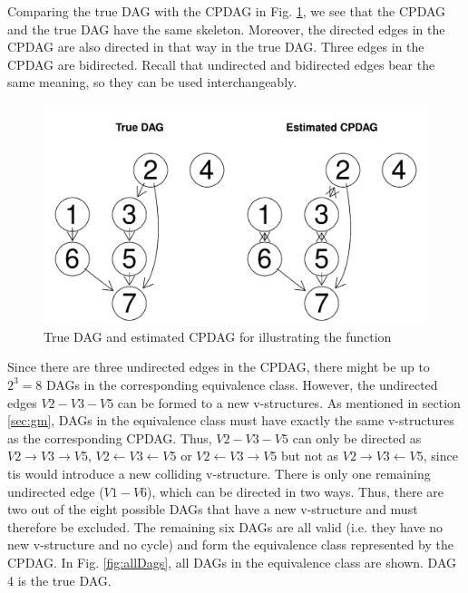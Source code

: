\documentclass[article]{jss}
\begin{document}
Comparing the true DAG with the CPDAG in Fig. \ref{fig:ida}, we see that
the CPDAG and the true DAG have the same skeleton. Moreover, the directed
edges in the CPDAG are also directed in that way in the true DAG. Three
edges in the CPDAG are bidirected. Recall that undirected and bidirected
edges bear the same meaning, so they can be used interchangeably.
\begin{figure}
  \begin{center}
\includegraphics{pcalgDoc-idaExpl2}
\caption{True DAG and estimated CPDAG for illustrating the function }
\label{fig:ida}
\end{center}
\end{figure}

Since there are three undirected edges in the CPDAG, there might be up to
$2^3 = 8$ DAGs in the corresponding equivalence class. However, the
undirected edges $V2-V3-V5$ can be formed to a new v-structures. As
mentioned in section \ref{sec:gm}, DAGs in the equivalence class must have
exactly the same v-structures as the corresponding CPDAG. Thus, $V2-V3-V5$
can only be directed as $V2 \rightarrow V3 \rightarrow V5$, $V2 \leftarrow
V3 \leftarrow V5$ or $V2 \leftarrow V3 \rightarrow V5$ but not as $V2
\rightarrow V3 \leftarrow V5$, since tis would introduce a new colliding
v-structure. There is only one remaining undirected edge ($V1-V6$), which
can be directed in two ways. Thus, there are two out of the eight possible
DAGs that have a new v-structure and must therefore be excluded. The
remaining six DAGs are all valid (i.e. they have no new v-structure and no
cycle) and form the equivalence class represented by the CPDAG. In
Fig. \ref{fig:allDags}, all DAGs in the equivalence class are shown. DAG 4
is the true DAG. 
\end{document}
